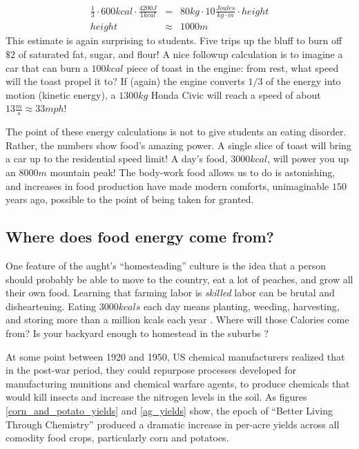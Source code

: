 \documentclass[12pt]{iopart}
\newcommand{\bea}{\begin{eqnarray}}
\newcommand{\eea}{\end{eqnarray}}
\begin{document}
\bea
\frac{1}{3}\cdot600kcal\cdot\frac{4200J}{1kcal} 
	&=& 80kg\cdot10\frac{Joules}{kg\cdot m}\cdot height \label{eq:bar_chart}\\
height &\approx&  1000 m
\eea
This estimate is again surprising to students.  Five trips up the bluff to burn off $\$2$ of saturated fat, sugar, and flour!  A nice followup calculation is to imagine a car that can burn a $100kcal$ piece of toast in the engine: from rest, what speed will the toast propel it to? If (again) the engine converts $1/3$ of the energy into motion (kinetic energy), a $1300kg$ Honda Civic will reach a speed of about $13\frac{m}{s}\approx33mph$!  

The point of these energy calculations is not to give students an eating disorder.  Rather, the numbers show food's amazing power. A single slice of toast will bring a car up to the residential speed limit!  A day's food, $3000kcal$, will power you up an $8000m$ mountain peak! The body-work food allows us to do is astonishing, and increases in food production have made modern  comforts, unimaginable $150$ years ago, possible to the point of being taken for granted.  

\clearpage

\subsection{Where does food energy come from?}
One feature of the aught's ``homesteading'' culture \cite{homesteading} is the idea that a person should probably be able to move to the country, eat a lot of peaches, and grow all their own food.  Learning that farming labor is \textit{skilled} labor can be brutal and disheartening. Eating $3000kcals$ each day means planting, weeding, harvesting, and storing more than a million kcals each year \cite{Haspel}.  Where will those Calories come from? Is your backyard enough to homestead in the suburbs \cite{backyard_homestead}?

At some point between 1920 and 1950, US chemical manufacturers realized that in the post-war period, they could repurpose processes developed for manufacturing munitions and chemical warfare agents, to produce chemicals that would kill insects and increase the nitrogen levels in the soil. 
As figures \ref{corn_and_potato_yields} and \ref{ag_yields} show, the epoch of ``Better Living Through Chemistry'' produced a dramatic increase in per-acre yields across all comodity food crops, particularly corn and potatoes.  
\end{document}
